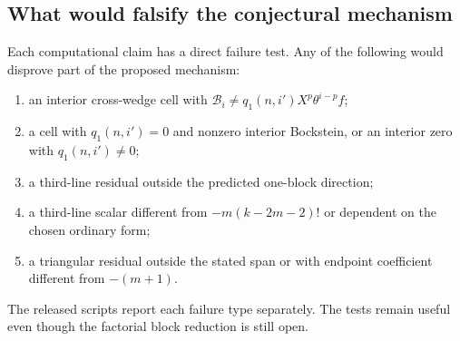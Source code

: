 \subsection{What would falsify the conjectural mechanism}

Each computational claim has a direct failure test.  Any of the following
would disprove part of the proposed mechanism:
\begin{enumerate}
\item an interior cross-wedge cell with
      $\mathcal B_i\neq q_1(n,i')X^p\theta^{i-p}f$;
\item a cell with $q_1(n,i')=0$ and nonzero interior Bockstein, or an
      interior zero with $q_1(n,i')\neq0$;
\item a third-line residual outside the predicted one-block direction;
\item a third-line scalar different from $-m(k-2m-2)!$ or dependent on the
      chosen ordinary form;
\item a triangular residual outside the stated span or with endpoint
      coefficient different from $-(m+1)$.
\end{enumerate}
The released scripts report each failure type separately.  The tests remain
useful even though the factorial block reduction is still open.
